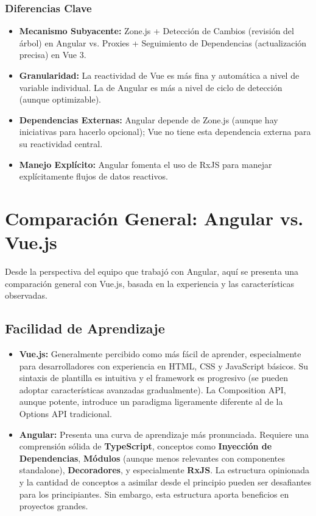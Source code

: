 \documentclass[11pt, a4paper]{article}
\begin{document}
\subsubsection{Diferencias Clave}
\begin{itemize}
    \item \textbf{Mecanismo Subyacente:} Zone.js + Detección de Cambios (revisión del árbol) en Angular vs. Proxies + Seguimiento de Dependencias (actualización precisa) en Vue 3.
    \item \textbf{Granularidad:} La reactividad de Vue es más fina y automática a nivel de variable individual. La de Angular es más a nivel de ciclo de detección (aunque optimizable).
    \item \textbf{Dependencias Externas:} Angular depende de Zone.js (aunque hay iniciativas para hacerlo opcional); Vue no tiene esta dependencia externa para su reactividad central.
    \item \textbf{Manejo Explícito:} Angular fomenta el uso de RxJS para manejar explícitamente flujos de datos reactivos.
\end{itemize}

\section{Comparación General: Angular vs. Vue.js}
Desde la perspectiva del equipo que trabajó con Angular, aquí se presenta una comparación general con Vue.js, basada en la experiencia y las características observadas.

\subsection{Facilidad de Aprendizaje}
\begin{itemize}
    \item \textbf{Vue.js:} Generalmente percibido como más fácil de aprender, especialmente para desarrolladores con experiencia en HTML, CSS y JavaScript básicos. Su sintaxis de plantilla es intuitiva y el framework es progresivo (se pueden adoptar características avanzadas gradualmente). La Composition API, aunque potente, introduce un paradigma ligeramente diferente al de la Options API tradicional.
    \item \textbf{Angular:} Presenta una curva de aprendizaje más pronunciada. Requiere una comprensión sólida de \textbf{TypeScript}, conceptos como \textbf{Inyección de Dependencias}, \textbf{Módulos} (aunque menos relevantes con componentes standalone), \textbf{Decoradores}, y especialmente \textbf{RxJS}. La estructura opinionada y la cantidad de conceptos a asimilar desde el principio pueden ser desafiantes para los principiantes. Sin embargo, esta estructura aporta beneficios en proyectos grandes.
\end{itemize}
\end{document}
